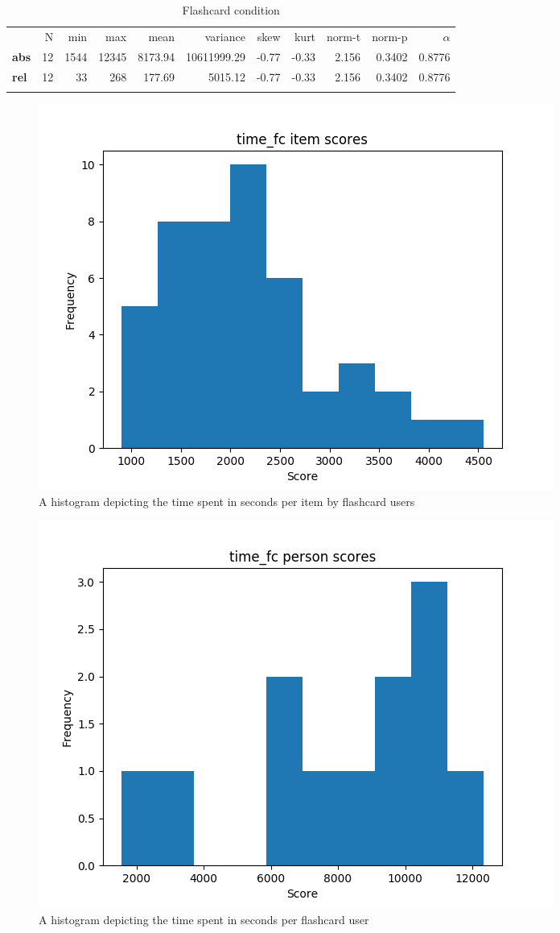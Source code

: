 \begin{longtable}[c]{@{}lrrrrrrrrrr@{}}
\caption{Flashcard condition}
\endfirsthead
\toprule\addlinespace
& N & min & max & mean & variance & skew & kurt & norm-t &
norm-p & $\alpha$
\\\addlinespace
\midrule
\textbf{abs} & 12 & 1544 & 12345 & 8173.94 & 10611999.29 & -0.77 & -0.33
& 2.156 & 0.3402 & 0.8776
\\\addlinespace
\textbf{rel} & 12 & 33 & 268 & 177.69 & 5015.12 & -0.77 & -0.33 & 2.156
& 0.3402 & 0.8776
\\\addlinespace
\bottomrule
    \label{tab:time_fc}
\end{longtable}

\begin{figure}
    \includegraphics[width=\textwidth]{img/time_fc_diff.png}
    \caption{A histogram depicting the time spent in seconds per item by flashcard users} 
    \label{fig:time_fc_diff}
\end{figure}
\begin{figure}
    \includegraphics[width=\textwidth]{img/time_fc_abil.png}
    \caption{A histogram depicting the time spent in seconds per flashcard user}
    \label{fig:time_fc_abil}
\end{figure}


